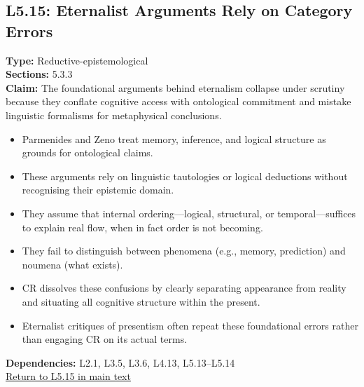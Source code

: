 \documentclass[12pt]{book}
\newcommand{\returnlink}[1]{\hyperref[logic:#1]{Return to #1 in main text}\xspace}
\begin{document}
\subsection*{L5.15: Eternalist Arguments Rely on Category Errors}
\label{appendix:L5.15}
\textbf{Type:} Reductive-epistemological \\
\textbf{Sections:} 5.3.3 \\
\textbf{Claim:} The foundational arguments behind eternalism collapse under scrutiny because they conflate cognitive access with ontological commitment and mistake linguistic formalisms for metaphysical conclusions.
\begin{itemize}
  \item Parmenides and Zeno treat memory, inference, and logical structure as grounds for ontological claims.
  \item These arguments rely on linguistic tautologies or logical deductions without recognising their epistemic domain.
  \item They assume that internal ordering---logical, structural, or temporal---suffices to explain real flow, when in fact order is not becoming.
  \item They fail to distinguish between phenomena (e.g., memory, prediction) and noumena (what exists).
  \item CR dissolves these confusions by clearly separating appearance from reality and situating all cognitive structure within the present.
  \item Eternalist critiques of presentism often repeat these foundational errors rather than engaging CR on its actual terms.
\end{itemize}
\textbf{Dependencies:} L2.1, L3.5, L3.6, L4.13, L5.13–L5.14 \\
\returnlink{L5.15}
\end{document}
